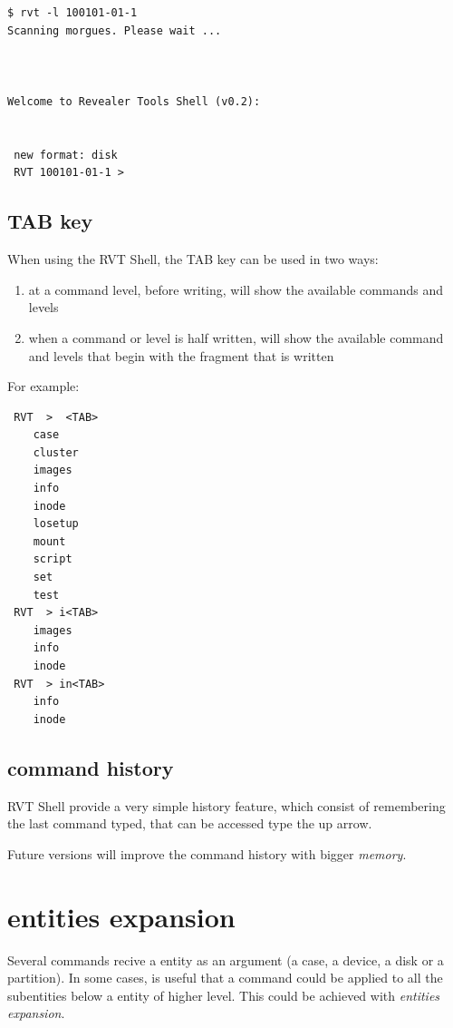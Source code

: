 \documentclass[a4paper,11pt,oneside]{report}
\begin{document}
\begin{verbatim}
$ rvt -l 100101-01-1
Scanning morgues. Please wait ...



Welcome to Revealer Tools Shell (v0.2):


 new format: disk
 RVT 100101-01-1 >  
\end{verbatim}



\subsection{TAB key}

When using the RVT Shell, the TAB key can be used in two ways:

\begin{enumerate}
\item at a command level, before writing, will show the available commands and levels
\item when a command or level is half written, will show the available command and levels that begin with the fragment that is written
\end{enumerate}

For example:

\begin{verbatim}
 RVT  >  <TAB>	
	case
	cluster
	images
	info
	inode
	losetup
	mount
	script
	set
	test
 RVT  > i<TAB>	
	images
	info
	inode
 RVT  > in<TAB>	
	info
	inode
\end{verbatim}


\subsection{command history}

RVT Shell provide a very simple history feature, which consist of remembering the last command typed, that can be accessed type the up arrow.

Future versions will improve the command history with bigger \emph{memory}.






\section{entities expansion}

Several commands recive a entity as an argument (a case, a device, a disk or a partition).  In some cases, is useful that a command could be applied to all the subentities below a entity of higher level. This could be achieved with \emph{entities expansion}.
\end{document}
